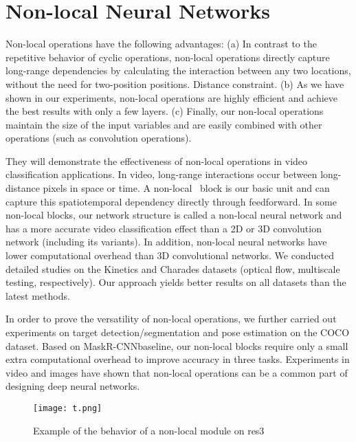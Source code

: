 \documentclass[10pt,twocolumn,letterpaper]{article}
\begin{document}
\section{Non-local Neural Networks}
Non-local operations have the following advantages: (a) In contrast to the repetitive behavior of cyclic operations, non-local operations directly capture long-range dependencies by calculating the interaction between any two locations, without the need for two-position positions. Distance constraint. (b) As we have shown in our experiments, non-local operations are highly efficient and achieve the best results with only a few layers. (c) Finally, our non-local operations maintain the size of the input variables and are easily combined with other operations (such as convolution operations).
\par They will demonstrate the effectiveness of non-local operations in video classification applications. In video, long-range interactions occur between long-distance pixels in space or time. A non-local~\cite{name49} block is our basic unit and can capture this spatiotemporal dependency directly through feedforward. In some non-local blocks, our network structure is called a non-local neural network and has a more accurate video classification effect than a 2D or 3D convolution network (including its variants). In addition, non-local neural networks have lower computational overhead than 3D convolutional networks. We conducted detailed studies on the Kinetics and Charades datasets (optical flow, multiscale testing, respectively). Our approach yields better results on all datasets than the latest methods.
\par In order to prove the versatility of non-local operations, we further carried out experiments on target detection/segmentation and pose estimation on the COCO dataset. Based on MaskR-CNNbaseline, our non-local blocks require only a small extra computational overhead to improve accuracy in three tasks. Experiments in video and images have shown that non-local operations can be a common part of designing deep neural networks.
  \begin{figure}[!htb]
  	\centering
  	\texttt{[image: t.png]}\\
  	\caption{Example of the behavior of a non-local module on res3}\label{Figure1}
  \end{figure}


\end{document}
